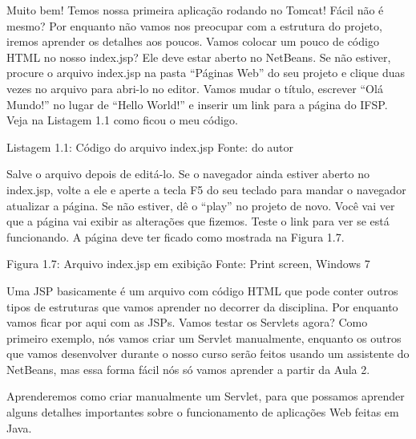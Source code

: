 Muito bem! Temos nossa primeira aplicação rodando no Tomcat! Fácil não é mesmo? Por enquanto não vamos nos preocupar com a estrutura do projeto, iremos aprender os detalhes aos poucos. Vamos colocar um pouco de código HTML no nosso index.jsp? Ele deve estar aberto no NetBeans. Se não estiver, procure o arquivo index.jsp na pasta ``Páginas Web'' do seu projeto e clique duas vezes no arquivo para abri-lo no editor. Vamos mudar o título, escrever ``Olá Mundo!'' no lugar de ``Hello World!'' e inserir um link para a página do IFSP. Veja na Listagem 1.1 como ficou o meu código.

Listagem 1.1: Código do arquivo index.jsp
Fonte: do autor

Salve o arquivo depois de editá-lo. Se o navegador ainda estiver aberto no index.jsp, volte a ele e aperte a tecla F5 do seu teclado para mandar o navegador atualizar a página. Se não estiver, dê o ``play'' no projeto de novo. Você vai ver que a página vai exibir as alterações que fizemos. Teste o link para ver se está funcionando. A página deve ter ficado como mostrada na Figura 1.7.

Figura 1.7: Arquivo index.jsp em exibição
Fonte: Print screen, Windows 7

Uma JSP basicamente é um arquivo com código HTML que pode conter outros tipos de estruturas que vamos aprender no decorrer da disciplina. Por enquanto vamos ficar por aqui com as JSPs. Vamos testar os Servlets agora? Como primeiro exemplo, nós vamos criar um Servlet manualmente, enquanto os outros que vamos desenvolver durante o nosso curso serão feitos usando um assistente do NetBeans, mas essa forma fácil nós só vamos aprender a partir da Aula 2.

Aprenderemos como criar manualmente um Servlet, para que possamos aprender alguns detalhes importantes sobre o funcionamento de aplicações Web feitas em Java.

